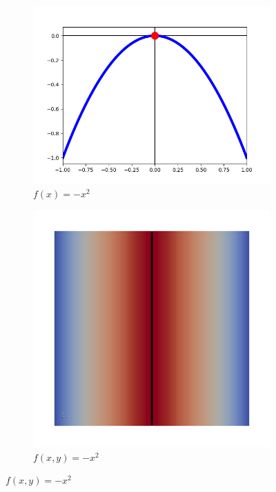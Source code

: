 \begin{figure}[t]
  \begin{subfigure}[b]{0.33\textwidth}
    \includegraphics[width=\textwidth]{Images/func1D.png}
    \caption{$f(x)= -x^2$}
    \label{fig:ridge1D}
  \end{subfigure}
  \begin{subfigure}[b]{0.33\textwidth}
    \includegraphics[width=\textwidth]{Images/func2D.png}
    \caption{$f(x,y)= -x^2$}

\end{subfigure}
\end{figure}
